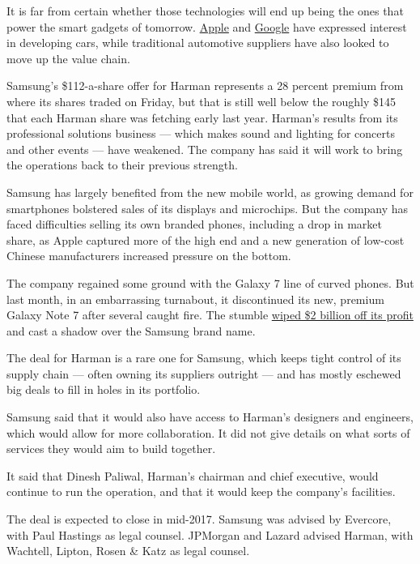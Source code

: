 It is far from certain whether those technologies will end up being the
ones that power the smart gadgets of tomorrow.
\href{http://www.nytimes.com/2016/09/10/technology/apple-is-said-to-be-rethinking-strategy-on-self-driving-cars.html}{Apple}
and
\href{http://www.nytimes.com/2016/08/06/technology/alphabet-google-autonomous-car-chris-urmson.html}{Google}
have expressed interest in developing cars, while traditional automotive
suppliers have also looked to move up the value chain.

Samsung's \$112-a-share offer for Harman represents a 28 percent premium
from where its shares traded on Friday, but that is still well below the
roughly \$145 that each Harman share was fetching early last year.
Harman's results from its professional solutions business --- which
makes sound and lighting for concerts and other events --- have
weakened. The company has said it will work to bring the operations back
to their previous strength.

Samsung has largely benefited from the new mobile world, as growing
demand for smartphones bolstered sales of its displays and microchips.
But the company has faced difficulties selling its own branded phones,
including a drop in market share, as Apple captured more of the high end
and a new generation of low-cost Chinese manufacturers increased
pressure on the bottom.

The company regained some ground with the Galaxy 7 line of curved
phones. But last month, in an embarrassing turnabout, it discontinued
its new, premium Galaxy Note 7 after several caught fire. The stumble
\href{http://www.nytimes.com/2016/10/28/business/samsung-galaxy-note-7-profit.html}{wiped
\$2 billion off its profit} and cast a shadow over the Samsung brand
name.

The deal for Harman is a rare one for Samsung, which keeps tight control
of its supply chain --- often owning its suppliers outright --- and has
mostly eschewed big deals to fill in holes in its portfolio.

Samsung said that it would also have access to Harman's designers and
engineers, which would allow for more collaboration. It did not give
details on what sorts of services they would aim to build together.

It said that Dinesh Paliwal, Harman's chairman and chief executive,
would continue to run the operation, and that it would keep the
company's facilities.

The deal is expected to close in mid-2017. Samsung was advised by
Evercore, with Paul Hastings as legal counsel. JPMorgan and Lazard
advised Harman, with Wachtell, Lipton, Rosen \& Katz as legal counsel.

